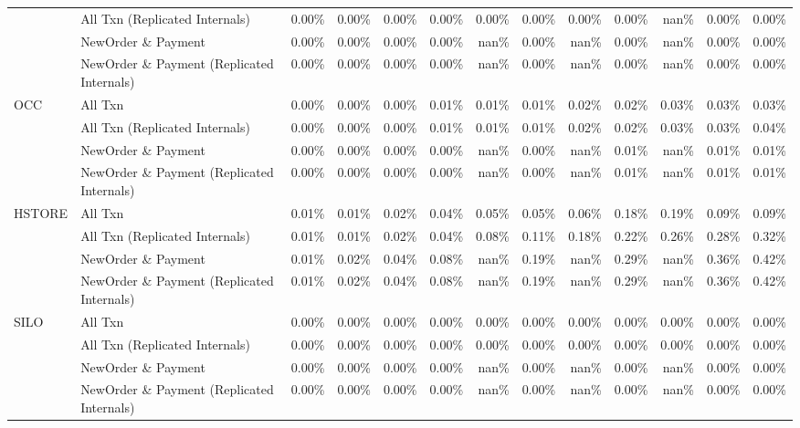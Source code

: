 \begin{tabular}{llrrrrrrrrrrr}
       & All Txn (Replicated Internals) & 0.00\% & 0.00\% & 0.00\% & 0.00\% & 0.00\% & 0.00\% & 0.00\% & 0.00\% &  nan\% & 0.00\% & 0.00\% \\
       & NewOrder \& Payment & 0.00\% & 0.00\% & 0.00\% & 0.00\% &  nan\% & 0.00\% &  nan\% & 0.00\% &  nan\% & 0.00\% & 0.00\% \\
       & NewOrder \& Payment (Replicated Internals) & 0.00\% & 0.00\% & 0.00\% & 0.00\% &  nan\% & 0.00\% &  nan\% & 0.00\% &  nan\% & 0.00\% & 0.00\% \\
OCC & All Txn & 0.00\% & 0.00\% & 0.00\% & 0.01\% & 0.01\% & 0.01\% & 0.02\% & 0.02\% & 0.03\% & 0.03\% & 0.03\% \\
       & All Txn (Replicated Internals) & 0.00\% & 0.00\% & 0.00\% & 0.01\% & 0.01\% & 0.01\% & 0.02\% & 0.02\% & 0.03\% & 0.03\% & 0.04\% \\
       & NewOrder \& Payment & 0.00\% & 0.00\% & 0.00\% & 0.00\% &  nan\% & 0.00\% &  nan\% & 0.01\% &  nan\% & 0.01\% & 0.01\% \\
       & NewOrder \& Payment (Replicated Internals) & 0.00\% & 0.00\% & 0.00\% & 0.00\% &  nan\% & 0.00\% &  nan\% & 0.01\% &  nan\% & 0.01\% & 0.01\% \\
HSTORE & All Txn & 0.01\% & 0.01\% & 0.02\% & 0.04\% & 0.05\% & 0.05\% & 0.06\% & 0.18\% & 0.19\% & 0.09\% & 0.09\% \\
       & All Txn (Replicated Internals) & 0.01\% & 0.01\% & 0.02\% & 0.04\% & 0.08\% & 0.11\% & 0.18\% & 0.22\% & 0.26\% & 0.28\% & 0.32\% \\
       & NewOrder \& Payment & 0.01\% & 0.02\% & 0.04\% & 0.08\% &  nan\% & 0.19\% &  nan\% & 0.29\% &  nan\% & 0.36\% & 0.42\% \\
       & NewOrder \& Payment (Replicated Internals) & 0.01\% & 0.02\% & 0.04\% & 0.08\% &  nan\% & 0.19\% &  nan\% & 0.29\% &  nan\% & 0.36\% & 0.42\% \\
SILO & All Txn & 0.00\% & 0.00\% & 0.00\% & 0.00\% & 0.00\% & 0.00\% & 0.00\% & 0.00\% & 0.00\% & 0.00\% & 0.00\% \\
       & All Txn (Replicated Internals) & 0.00\% & 0.00\% & 0.00\% & 0.00\% & 0.00\% & 0.00\% & 0.00\% & 0.00\% & 0.00\% & 0.00\% & 0.00\% \\
       & NewOrder \& Payment & 0.00\% & 0.00\% & 0.00\% & 0.00\% &  nan\% & 0.00\% &  nan\% & 0.00\% &  nan\% & 0.00\% & 0.00\% \\
       & NewOrder \& Payment (Replicated Internals) & 0.00\% & 0.00\% & 0.00\% & 0.00\% &  nan\% & 0.00\% &  nan\% & 0.00\% &  nan\% & 0.00\% & 0.00\% \\

\end{tabular}
